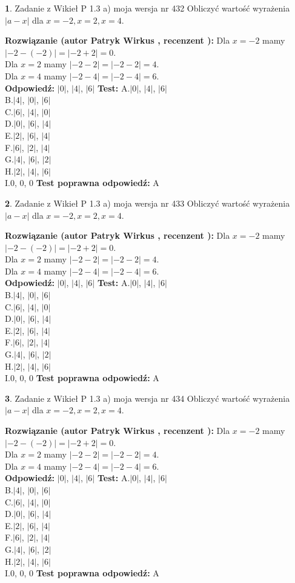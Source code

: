 \documentclass[12pt, a4paper]{article}
\theoremstyle{definition} %
\newtheorem{zad}{}
\newcommand{\zadStart}[1]{\begin{zad}#1\newline}
\newcommand{\zadStop}{\end{zad}}
\newcommand{\rozwStart}[2]{\noindent \textbf{Rozwiązanie (autor #1 , recenzent #2): }\newline}
\newcommand{\rozwStop}{\newline}
\newcommand{\odpStart}{\noindent \textbf{Odpowiedź:}\newline}
\newcommand{\odpStop}{\newline}
\newcommand{\testStart}{\noindent \textbf{Test:}\newline}
\newcommand{\testStop}{\newline}
\newcommand{\kluczStart}{\noindent \textbf{Test poprawna odpowiedź:}\newline}
\newcommand{\kluczStop}{\newline}
\begin{document}
\zadStart{Zadanie z Wikieł P 1.3 a) moja wersja nr 432}
Obliczyć wartość wyrażenia $|a - x|$ dla $x=-2,x=2,x=4$.
\zadStop
\rozwStart{Patryk Wirkus}{}
Dla $x = -2$ mamy $|-2 - (-2)| = |-2 + 2| = 0$.\\
Dla $x = 2$ mamy $|-2 - 2| = |-2 - 2| = 4$.\\
Dla $x = 4$ mamy $|-2 - 4| = |-2 - 4| = 6$.\\
\rozwStop
\odpStart
$|0|$, $|4|$, $|6|$
\odpStop
\testStart
A.$|0|$, $|4|$, $|6|$\\
B.$|4|$, $|0|$, $|6|$\\
C.$|6|$, $|4|$, $|0|$\\
D.$|0|$, $|6|$, $|4|$\\
E.$|2|$, $|6|$, $|4|$\\
F.$|6|$, $|2|$, $|4|$\\
G.$|4|$, $|6|$, $|2|$\\
H.$|2|$, $|4|$, $|6|$\\
I.$0$, $0$, $0$
\testStop
\kluczStart
A
\kluczStop



\zadStart{Zadanie z Wikieł P 1.3 a) moja wersja nr 433}
Obliczyć wartość wyrażenia $|a - x|$ dla $x=-2,x=2,x=4$.
\zadStop
\rozwStart{Patryk Wirkus}{}
Dla $x = -2$ mamy $|-2 - (-2)| = |-2 + 2| = 0$.\\
Dla $x = 2$ mamy $|-2 - 2| = |-2 - 2| = 4$.\\
Dla $x = 4$ mamy $|-2 - 4| = |-2 - 4| = 6$.\\
\rozwStop
\odpStart
$|0|$, $|4|$, $|6|$
\odpStop
\testStart
A.$|0|$, $|4|$, $|6|$\\
B.$|4|$, $|0|$, $|6|$\\
C.$|6|$, $|4|$, $|0|$\\
D.$|0|$, $|6|$, $|4|$\\
E.$|2|$, $|6|$, $|4|$\\
F.$|6|$, $|2|$, $|4|$\\
G.$|4|$, $|6|$, $|2|$\\
H.$|2|$, $|4|$, $|6|$\\
I.$0$, $0$, $0$
\testStop
\kluczStart
A
\kluczStop



\zadStart{Zadanie z Wikieł P 1.3 a) moja wersja nr 434}
Obliczyć wartość wyrażenia $|a - x|$ dla $x=-2,x=2,x=4$.
\zadStop
\rozwStart{Patryk Wirkus}{}
Dla $x = -2$ mamy $|-2 - (-2)| = |-2 + 2| = 0$.\\
Dla $x = 2$ mamy $|-2 - 2| = |-2 - 2| = 4$.\\
Dla $x = 4$ mamy $|-2 - 4| = |-2 - 4| = 6$.\\
\rozwStop
\odpStart
$|0|$, $|4|$, $|6|$
\odpStop
\testStart
A.$|0|$, $|4|$, $|6|$\\
B.$|4|$, $|0|$, $|6|$\\
C.$|6|$, $|4|$, $|0|$\\
D.$|0|$, $|6|$, $|4|$\\
E.$|2|$, $|6|$, $|4|$\\
F.$|6|$, $|2|$, $|4|$\\
G.$|4|$, $|6|$, $|2|$\\
H.$|2|$, $|4|$, $|6|$\\
I.$0$, $0$, $0$
\testStop
\kluczStart
A
\kluczStop
\end{document}

